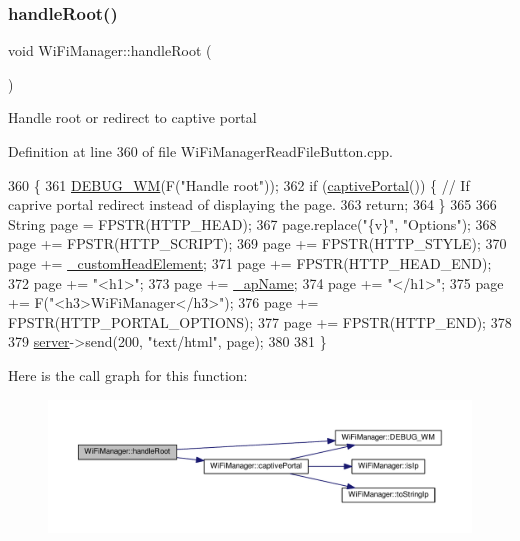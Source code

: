 \subsubsection{\texorpdfstring{handle\+Root()}{handleRoot()}}
{\footnotesize\ttfamily void Wi\+Fi\+Manager\+::handle\+Root (\begin{DoxyParamCaption}{ }\end{DoxyParamCaption})\hspace{0.3cm}{\ttfamily [private]}}

Handle root or redirect to captive portal 

Definition at line 360 of file Wi\+Fi\+Manager\+Read\+File\+Button.\+cpp.


\begin{DoxyCode}
360                              \{
361   \hyperlink{class_wi_fi_manager_ae5f595c670ccbcf9a191baf50f5c7c26}{DEBUG\_WM}(F(\textcolor{stringliteral}{"Handle root"}));
362   \textcolor{keywordflow}{if} (\hyperlink{class_wi_fi_manager_a4ef4298deb224212e5242c456669a973}{captivePortal}()) \{ \textcolor{comment}{// If caprive portal redirect instead of displaying the page.}
363     \textcolor{keywordflow}{return};
364   \}
365 
366   String page = FPSTR(HTTP\_HEAD);
367   page.replace(\textcolor{stringliteral}{"\{v\}"}, \textcolor{stringliteral}{"Options"});
368   page += FPSTR(HTTP\_SCRIPT);
369   page += FPSTR(HTTP\_STYLE);
370   page += \hyperlink{class_wi_fi_manager_a8860012564a62209d750c50e56319192}{\_customHeadElement};
371   page += FPSTR(HTTP\_HEAD\_END);
372   page += \textcolor{stringliteral}{"<h1>"};
373   page += \hyperlink{class_wi_fi_manager_a2c27e2f375122254cde4b2fd9ed1e117}{\_apName};
374   page += \textcolor{stringliteral}{"</h1>"};
375   page += F(\textcolor{stringliteral}{"<h3>WiFiManager</h3>"});
376   page += FPSTR(HTTP\_PORTAL\_OPTIONS);
377   page += FPSTR(HTTP\_END);
378 
379   \hyperlink{class_wi_fi_manager_a509523a01c0395cf0dc235b074f2a5ea}{server}->send(200, \textcolor{stringliteral}{"text/html"}, page);
380 
381 \}
\end{DoxyCode}
Here is the call graph for this function\+:
\nopagebreak
\begin{figure}[H]
\begin{center}
\leavevmode
\includegraphics[width=350pt]{d4/dc8/class_wi_fi_manager_a47e4c7df7478f690c53ff9f5125c9760_cgraph}
\end{center}
\end{figure}
